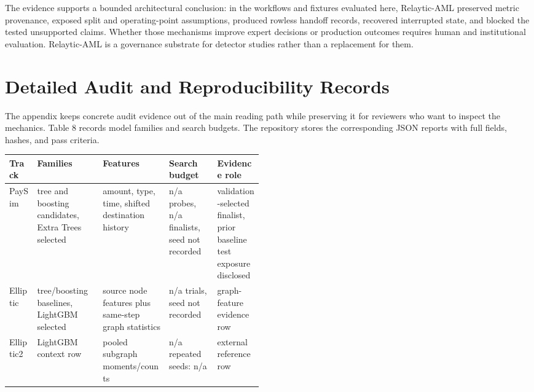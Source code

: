 \documentclass[11pt]{article}
\begin{document}
The evidence supports a bounded architectural conclusion: in the workflows and fixtures evaluated here, Relaytic-AML preserved metric provenance, exposed split and operating-point assumptions, produced rowless handoff records, recovered interrupted state, and blocked the tested unsupported claims. Whether those mechanisms improve expert decisions or production outcomes requires human and institutional evaluation. Relaytic-AML is a governance substrate for detector studies rather than a replacement for them.

\appendix
\section{Detailed Audit and Reproducibility Records}

The appendix keeps concrete audit evidence out of the main reading path while preserving it for reviewers who want to inspect the mechanics. Table 8 records model families and search budgets. The repository stores the corresponding JSON reports with full fields, hashes, and pass criteria.

\begin{center}
\begin{minipage}{\linewidth}
\scriptsize
\setlength{\tabcolsep}{3pt}
\renewcommand{\arraystretch}{1.16}
\begin{tabularx}{\linewidth}{@{}>{\raggedright\arraybackslash}p{0.11\linewidth} >{\raggedright\arraybackslash}X >{\raggedright\arraybackslash}X >{\raggedright\arraybackslash}p{0.19\linewidth} >{\raggedright\arraybackslash}p{0.18\linewidth}@{}}
\toprule
Track & Families & Features & Search budget & Evidence role \\
\midrule
PaySim & tree and boosting candidates, Extra Trees selected & amount, type, time, shifted destination history & n/a probes, n/a finalists, seed not recorded & validation-selected finalist, prior baseline test exposure disclosed \\
Elliptic & tree/boosting baselines, LightGBM selected & source node features plus same-step graph statistics & n/a trials, seed not recorded & graph-feature evidence row \\
Elliptic2 & LightGBM context row & 348 pooled subgraph moments/counts & n/a repeated seeds: n/a & external reference row \\
\bottomrule
\end{tabularx}
\end{minipage}
\end{center}
\end{document}
